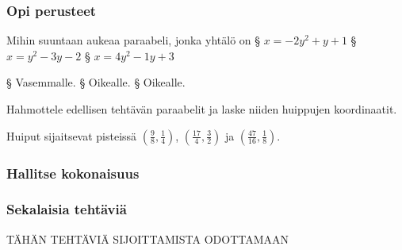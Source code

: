 \begin{tehtavasivu}

\subsubsection*{Opi perusteet}

\begin{tehtava}
    Mihin suuntaan aukeaa paraabeli, jonka yhtälö on
    \alakohdat
        § $x = -2y^2 + y + 1$
        § $x = y^2 - 3y -2$
        § $x = 4y^2 - 1y +3$
    \loppu
    \begin{vastaus}
          \alakohdat
          § Vasemmalle.
          § Oikealle.
          § Oikealle.
          \loppu
    \end{vastaus}
\end{tehtava}

\begin{tehtava}
    Hahmottele edellisen tehtävän paraabelit ja laske niiden huippujen koordinaatit.
    \begin{vastaus}
          Huiput sijaitsevat pisteissä $\left(\frac{9}{8}, \frac{1}{4}\right)$, $\left(\frac{17}{4},\frac{3}{2}\right)$ ja $\left(\frac{47}{16},\frac{1}{8}\right).$
    \end{vastaus}
\end{tehtava}

\subsubsection*{Hallitse kokonaisuus}

\subsubsection*{Sekalaisia tehtäviä}

TÄHÄN TEHTÄVIÄ SIJOITTAMISTA ODOTTAMAAN


\end{tehtavasivu}